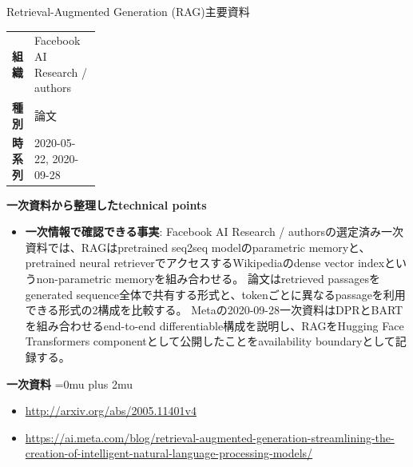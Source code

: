\begin{technicalnote}{Retrieval-Augmented Generation (RAG)}{主要資料}
\begingroup
\begin{tabularx}{\linewidth}{@{}>{\bfseries}p{0.22\linewidth}X@{}}
組織 & Facebook AI Research / authors \\
種別 & 論文 \\
時系列 & 2020-05-22, 2020-09-28 \\
\end{tabularx}
\smallskip
{\bfseries 一次資料から整理したtechnical points}
\begin{itemize}[leftmargin=1.5em,itemsep=0.35em]
\item \textbf{一次情報で確認できる事実}: Facebook AI Research / authorsの選定済み一次資料では、RAGはpretrained seq2seq modelのparametric memoryと、pretrained neural retrieverでアクセスするWikipediaのdense vector indexというnon-parametric memoryを組み合わせる。 論文はretrieved passagesをgenerated sequence全体で共有する形式と、tokenごとに異なるpassageを利用できる形式の2構成を比較する。 Metaの2020-09-28一次資料はDPRとBARTを組み合わせるend-to-end differentiable構成を説明し、RAGをHugging Face Transformers componentとして公開したことをavailability boundaryとして記録する。
\end{itemize}
\begin{minipage}{\linewidth}
\begin{samepage}
{\bfseries 一次資料}
\begingroup\sloppy
\Urlmuskip=0mu plus 2mu\relax
\begin{itemize}[leftmargin=1.5em,itemsep=0.25em]
\item {\scriptsize\url{http://arxiv.org/abs/2005.11401v4}}
\item {\scriptsize\url{https://ai.meta.com/blog/retrieval-augmented-generation-streamlining-the-creation-of-intelligent-natural-language-processing-models/}}
\end{itemize}
\endgroup
\end{samepage}
\end{minipage}
\endgroup
\end{technicalnote}
\medskip

